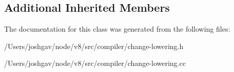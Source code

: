 \subsection*{Additional Inherited Members}


The documentation for this class was generated from the following files\+:\begin{DoxyCompactItemize}
\item 
/\+Users/joshgav/node/v8/src/compiler/change-\/lowering.\+h\item 
/\+Users/joshgav/node/v8/src/compiler/change-\/lowering.\+cc\end{DoxyCompactItemize}
